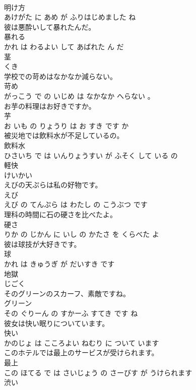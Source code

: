 \documentclass[8pt]{extreport}
\begin{document}
\begin{CJK}{UTF8}{min}
\\	明け方 
\\	あけがた に あめ が ふりはじめました ね			
\\	彼は悪酔いして暴れたんだ。	
\\	暴れる 
\\	かれ は わるよい して あばれた ん だ			
\\	茎	
\\	くき		
\\	学校での苛めはなかなか減らない。	
\\	苛め 
\\	がっこう で の いじめ は なかなか へらない 。			
\\	お芋の料理はお好きですか。	
\\	芋 
\\	お いも の りょうり は お すき です か			
\\	被災地では飲料水が不足しているの。	
\\	飲料水 
\\	ひさいち で は いんりょうすい が ふそく して いる の			
\\	軽快	
\\	けいかい		
\\	えびの天ぷらは私の好物です。	
\\	えび 
\\	えび の てんぷら は わたし の こうぶつ です			
\\	理科の時間に石の硬さを比べたよ。	
\\	硬さ 
\\	りか の じかん に いし の かたさ を くらべた よ			
\\	彼は球技が大好きです。	
\\	球 
\\	かれ は きゅうぎ が だいすき です			
\\	地獄	
\\	じごく		
\\	そのグリーンのスカーフ、素敵ですね。	
\\	グリーン 
\\	その ぐりーん の すかーふ すてき です ね			
\\	彼女は快い眠りについています。	
\\	快い 
\\	かのじょ は こころよい ねむり に ついて います			
\\	このホテルでは最上のサービスが受けられます。	
\\	最上 
\\	この ほてる で は さいじょう の さーびす が うけられます			
\\	渋い	

\end{CJK}
\end{document}
